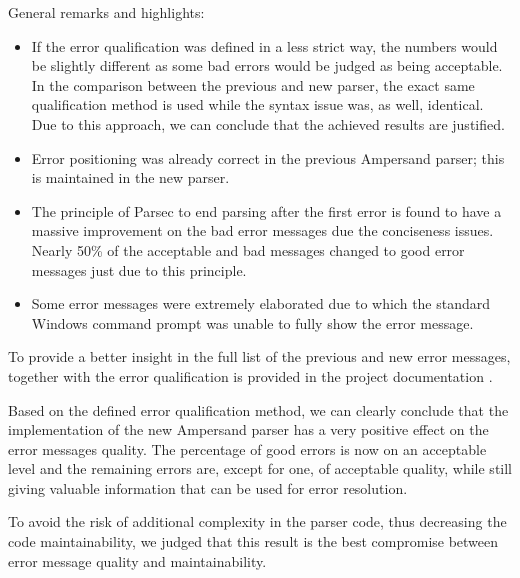 General remarks and highlights:
 \begin{itemize}
	\item 	If the error qualification was defined in a less strict way, the numbers would be slightly different as some bad errors would be judged as being acceptable. 
		In the comparison between the previous and new parser, the exact same qualification method is used while the syntax issue was, as well, identical.
		Due to this approach, we can conclude that the achieved results are justified.
	\item 	Error positioning was already correct in the previous Ampersand parser; this is maintained in the new parser.
	\item 	The principle of Parsec to end parsing after the first error is found to have a massive improvement on the bad error messages due the conciseness issues.
		Nearly 50\% of the acceptable and bad messages changed to good error messages just due to this principle.
	\item 	Some error messages were extremely elaborated due to which the standard Windows command prompt was unable to fully show the error message.
\end {itemize}

To provide a better insight in the full list of the previous and new error messages, together with the error qualification is provided in the project documentation .

Based on the defined error qualification method, we can clearly conclude that the implementation of the new Ampersand parser has a very positive effect on the error messages quality.
The percentage of good errors is now on an acceptable level and the remaining errors are, except for one, of acceptable quality, while still giving valuable information that can be used for error resolution.

To avoid the risk of additional complexity in the parser code, thus decreasing the code maintainability, we judged that this result is the best compromise between error message quality and maintainability.
